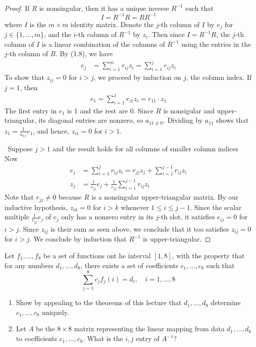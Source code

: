 \documentclass[12pt]{article}
\newenvironment{ex}[2][Exercise]{\begin{trivlist}
		\item[\hskip \labelsep {\bfseries #1}\hskip \labelsep {\bfseries #2.}]}{\end{trivlist}}
\newenvironment{sol}[1][Solution]{\begin{trivlist}
		\item[\hskip \labelsep {\bfseries #1:}]}{\end{trivlist}}
\begin{document}
\begin{sol}
	\
	\begin{proof}
		If $R$ is nonsingular, then it has a unique inverse $R^{-1}$ such that
		\[
		I=R^{-1}R=RR^{-1}
		\]
		where $I$ is the $m\times m$ identity matrix. Denote the $j$-th column of $I$
		by $e_j$ for $j\in\{1,\ldots,m\}$, and the $i$-th column of $R^{-1}$ by $z_i$.
		Then since $I=R^{-1}R$, the $j$-th column of $I$ is a linear combination of the columns
		of $R^{-1}$ using the entries in the $j$-th column of $R$. By (1.8), we have
		\begin{align*}
			e_j&=\sum_{i=1}^{m}r_{ij}z_i=\sum_{i=1}^{j}r_{ij}z_i
		\end{align*}
		To show that $z_{ij}=0$ for $i>j$, we proceed by induction on $j$, the column
		index. If $j=1$,
		then
		\begin{align*}
			e_1 = \sum_{i=1}^{1}r_{i1}z_i=r_{11}\cdot z_1
		\end{align*}
		The first entry in $e_1$ is 1 and the rest are 0. Since $R$ is nonsigular
		and upper-triangular, its diagonal entries are nonzero, so $a_{11\neq 0}$.
		Dividing by $a_{11}$ shows that $z_1=\frac{1}{a_{11}}e_1$, and hence,
		$z_{i1}=0$ for $i>1$.
		
		\
		Suppose $j>1$ and the result holds for all columns of smaller column indices
		Now
		\begin{align*}
			e_j&=\sum_{i=1}^{j}r_{ij}z_i=r_{jj}z_j + \sum_{i=1}^{j-1}r_{ij}z_i\\
			z_j&=\frac{1}{r_{jj}}e_j+\frac{1}{r_{jj}}\sum_{i=1}^{j-1}r_{ij}z_i
		\end{align*}
		Note that $r_{jj}\neq 0$ because $R$ is a nonsingular upper-triangular matrix.
		By our inductive hypothesis, $z_{ik}=0$ for $i>k$ whenever $1\leq i\leq j-1$.
		Since the scalar multiple $\frac{1}{r_{jj}}e_j$ of $e_j$ only has a nonzero
		entry in its $j$-th slot, it satisfies $e_{ij}=0$ for $i>j$. Since $z_{ij}$
		is their sum as seen above, we conclude that it too satisfies $z_{ij}=0$
		for $i>j$. We conclude by induction that $R^{-1}$ is upper-triangular.
	\end{proof}
\end{sol}

\begin{ex}{4}
	Let $f_1,\ldots,f_8$ be a set of functions ont he interval $[1,8]$, with the property
	that for any numbers $d_1,\ldots,d_8$, there exists a set of coefficients $c_1,\ldots,c_8$
	such that
	\[
	\sum_{j=1}^{8}c_jf_j(i)=d_i,\quad i=1,\ldots,8
	\]
	\begin{enumerate}[label=(\alph*)]
		\item Show by appealing to the theorems of this lecture that $d_1,\ldots,d_8$ determine
		$c_1,\ldots,c_8$ uniquely.
		\item Let $A$ be the $8\times 8$ matrix representing the linear mapping from data
		$d_1,\ldots,d_8$ to coefficients $c_1,\ldots,c_8$. What is the $i,j$ entry of $A^{-1}$?
	\end{enumerate}
\end{ex}
\end{document}
